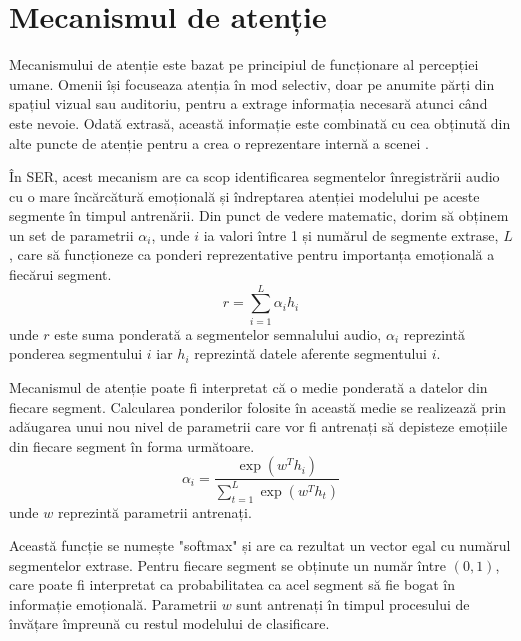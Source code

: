 \documentclass[a4paper,12pt]{book}
\begin{document}
				\section{Mecanismul de atenție} \label{attention}
				 Mecanismului de atenție este bazat  pe principiul de funcționare al percepției umane. Omenii  își focuseaza atenția în mod selectiv, doar pe anumite părți din spațiul vizual sau auditoriu, pentru a extrage informația necesară atunci când este nevoie. Odată extrasă, această informație este combinată cu cea obținută din alte puncte de atenție pentru a crea o reprezentare internă a scenei \cite{zhang, attention1}. \par
				 În SER, acest mecanism are ca scop identificarea segmentelor înregistrării audio cu o mare încărcătură emoțională și îndreptarea atenției modelului pe aceste segmente în timpul antrenării. Din punct de vedere matematic, dorim să obținem un set de parametrii $\alpha_i$, unde $i$ ia valori între 1 și numărul de segmente extrase, $L$, care să funcționeze ca ponderi reprezentative pentru importanța emoțională a fiecărui segment.
				\begin{equation}
					r = \sum_{i=1}^{L} \alpha_i h_i
				\end{equation}
				unde $r$ este suma ponderată a segmentelor semnalului audio, $\alpha_i$ reprezintă ponderea segmentului $i$ iar $h_i$ reprezintă datele aferente segmentului $i$. \par
				Mecanismul de atenție poate fi interpretat că o medie ponderată a datelor din fiecare segment. Calcularea ponderilor folosite în această medie se realizează prin adăugarea unui nou nivel de parametrii care vor fi antrenați să depisteze emoțiile din fiecare segment în forma următoare.
				\begin{equation} \label{softmax_form}
					\alpha_i = \frac{\exp(w^Th_i)}{\sum_{t=1}^{L} \exp(w^Th_t)}
				\end{equation}
				unde $w$ reprezintă parametrii antrenați. \par
				Această funcție se numește "softmax" și are ca rezultat un vector egal cu numărul segmentelor extrase. Pentru fiecare segment se obținute un număr între $(0, 1)$, care poate fi interpretat ca probabilitatea ca acel segment să fie bogat în informație emoțională.  Parametrii $w$ sunt antrenați în timpul procesului de învățare împreună cu restul modelului de clasificare.
			
\end{document}
